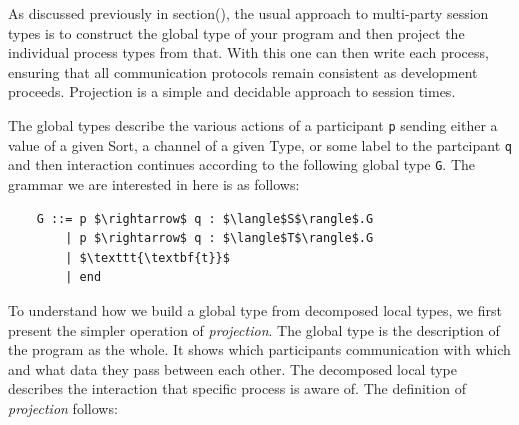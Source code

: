 \documentclass[11pt, abstracton, twoside]{scrartcl}
\begin{document}


As discussed previously in section(), the usual approach to multi-party session 
types is to construct the global type of your program and then project the 
individual process types from that. With this one can then write each process, 
ensuring that all communication protocols remain consistent as development 
proceeds. Projection is a simple and decidable approach to session times.

The global types describe the various actions of a participant \texttt{p} sending
either a value of a given Sort, a channel of a given Type, or some label to the
partcipant \texttt{q} and then interaction continues according to the following
global type \texttt{G}. The grammar we are interested in here is as follows:
\\
\begin{lstlisting}
    G ::= p $\rightarrow$ q : $\langle$S$\rangle$.G
        | p $\rightarrow$ q : $\langle$T$\rangle$.G
        | $\texttt{\textbf{t}}$
        | end
\end{lstlisting}

To understand how we build a global type from decomposed local types, we first 
present the simpler operation of \emph{projection}. The global type is the
description of the program as the whole. It shows which participants 
communication with which and what data they pass between each other. The decomposed
local type describes the interaction that specific process is aware of. The 
definition of \emph{projection} follows:
\end{document}
